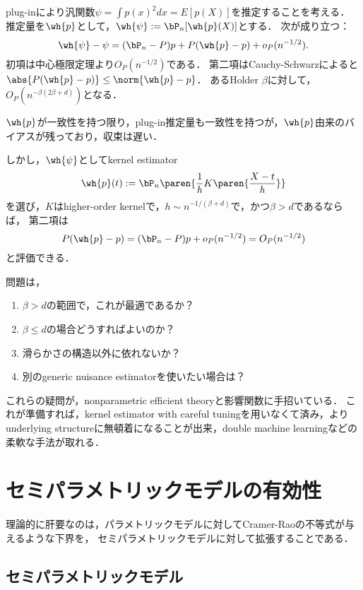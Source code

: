 \documentclass[uplatex,dvipdfmx]{jsreport}
\begin{document}
\begin{example}[第一段階によるバイアスが残る]
    plug-inにより汎関数$\psi=\int p(x)^2dx=E[p(X)]$を推定することを考える．
    推定量を$\wh{p}$として，$\wh{\psi}:=\bP_n[\wh{p}(X)]$とする．
    次が成り立つ：
    \[\wh{\psi}-\psi=(\bP_n-P)p+P(\wh{p}-p)+o_P(n^{-1/2}).\]
    初項は中心極限定理より$O_P(n^{-1/2})$である．
    第二項はCauchy-Schwarzによると$\abs{P(\wh{p}-p)}\le\norm{\wh{p}-p}$．
    あるHolder $\beta$に対して，$O_P(n^{-\beta(2\beta+d)})$となる．

    $\wh{p}$が一致性を持つ限り，plug-in推定量も一致性を持つが，$\wh{p}$由来のバイアスが残っており，収束は遅い．

    しかし，$\wh{\psi}$としてkernel estimator
    \[\wh{p}(t):=\bP_n\paren{\frac{1}{h}K\paren{\frac{X-t}{h}}}\]
    を選び，$K$はhigher-order kernelで，$h\sim n^{-1/(\beta+d)}$で，かつ$\beta>d$であるならば，
    第二項は
    \[P(\wh{p}-p)=(\bP_n-P)p+o_P(n^{-1/2})=O_P(n^{-1/2})\]
    と評価できる．

    問題は，
    \begin{enumerate}
        \item $\beta>d$の範囲で，これが最適であるか？
        \item $\beta\le d$の場合どうすればよいのか？
        \item 滑らかさの構造以外に依れないか？
        \item 別のgeneric nuisance estimatorを使いたい場合は？
    \end{enumerate}
    これらの疑問が，nonparametric efficient theoryと影響関数に手招いている．
    これが準備すれば，kernel estimator with careful tuningを用いなくて済み，よりunderlying structureに無頓着になることが出来，double machine learningなどの柔軟な手法が取れる．
\end{example}

\section{セミパラメトリックモデルの有効性}

\begin{tcolorbox}[colframe=ForestGreen, colback=ForestGreen!10!white,breakable,colbacktitle=ForestGreen!40!white,coltitle=black,fonttitle=\bfseries\sffamily,
title=]
    理論的に肝要なのは，パラメトリックモデルに対してCramer-Raoの不等式が与えるような下界を，
    セミパラメトリックモデルに対して拡張することである．
\end{tcolorbox}

\subsection{セミパラメトリックモデル}
\end{document}
